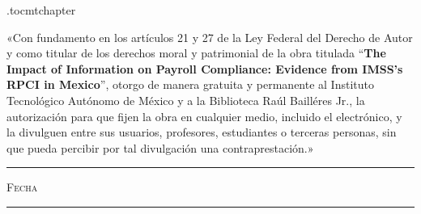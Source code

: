 \documentclass[10pt, oneside]{book}
\begin{document}








\newpage

\etocdepthtag.toc{mtchapter}


\thispagestyle{empty}

\vspace*{\fill}
\begingroup

\noindent
«Con fundamento en los artículos 21 y 27 de la Ley Federal del Derecho de Autor y como titular de los derechos moral y patrimonial de la obra titulada ``\textbf{The Impact of Information on Payroll Compliance: Evidence from IMSS's RPCI in Mexico}'', otorgo de manera gratuita y permanente al Instituto Tecnológico Autónomo de México y a la Biblioteca Raúl Bailléres Jr., la autorización para que fijen la obra en cualquier medio, incluido el electrónico, y la divulguen entre sus usuarios, profesores, estudiantes o terceras personas, sin que pueda percibir por tal divulgación una contraprestación.»


\centering 

\vspace{5em}

\rule[1em]{20em}{0.5pt} %

\textsc{Fecha}
 
\vspace{8em}

\rule[1em]{20em}{0.5pt} %
\end{document}
